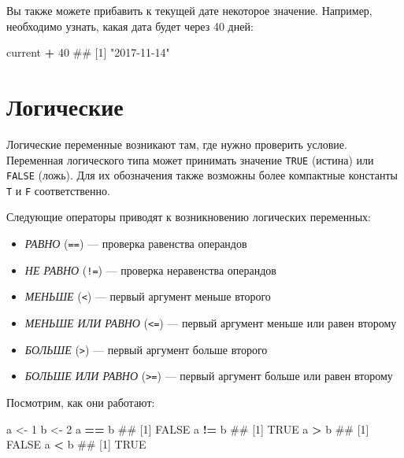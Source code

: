 \documentclass[]{book}
\newenvironment{Shaded}{\begin{snugshade}}{\end{snugshade}}
\newcommand{\DecValTok}[1]{\textcolor[rgb]{0.00,0.00,0.81}{#1}}
\newcommand{\StringTok}[1]{\textcolor[rgb]{0.31,0.60,0.02}{#1}}
\newcommand{\OperatorTok}[1]{\textcolor[rgb]{0.81,0.36,0.00}{\textbf{#1}}}
\newcommand{\NormalTok}[1]{#1}
\providecommand{\tightlist}{%
  \setlength{\itemsep}{0pt}\setlength{\parskip}{0pt}}
\begin{document}
Вы также можете прибавить к текущей дате некоторое значение. Например,
необходимо узнать, какая дата будет через 40 дней:

\begin{Shaded}
\begin{Highlighting}[]
\NormalTok{current }\OperatorTok{+}\StringTok{ }\DecValTok{40}
\NormalTok{## [1] "2017-11-14"}
\end{Highlighting}
\end{Shaded}

\section{Логические}\label{booleans}

Логические переменные возникают там, где нужно проверить условие.
Переменная логического типа может принимать значение \texttt{TRUE}
(истина) или \texttt{FALSE} (ложь). Для их обозначения также возможны
более компактные константы \texttt{T} и \texttt{F} соответственно.

Следующие операторы приводят к возникновению логических переменных:

\begin{itemize}
\tightlist
\item
  \emph{РАВНО} (\texttt{==}) --- проверка равенства операндов
\item
  \emph{НЕ РАВНО} (\texttt{!=}) --- проверка неравенства операндов
\item
  \emph{МЕНЬШЕ} (\texttt{\textless{}}) --- первый аргумент меньше
  второго
\item
  \emph{МЕНЬШЕ ИЛИ РАВНО} (\texttt{\textless{}=}) --- первый аргумент
  меньше или равен второму
\item
  \emph{БОЛЬШЕ} (\texttt{\textgreater{}}) --- первый аргумент больше
  второго
\item
  \emph{БОЛЬШЕ ИЛИ РАВНО} (\texttt{\textgreater{}=}) --- первый аргумент
  больше или равен второму
\end{itemize}

Посмотрим, как они работают:

\begin{Shaded}
\begin{Highlighting}[]
\NormalTok{a <-}\StringTok{ }\DecValTok{1}
\NormalTok{b <-}\StringTok{ }\DecValTok{2}
\NormalTok{a }\OperatorTok{==}\StringTok{ }\NormalTok{b}
\NormalTok{## [1] FALSE}
\NormalTok{a }\OperatorTok{!=}\StringTok{ }\NormalTok{b}
\NormalTok{## [1] TRUE}
\NormalTok{a }\OperatorTok{>}\StringTok{ }\NormalTok{b}
\NormalTok{## [1] FALSE}
\NormalTok{a }\OperatorTok{<}\StringTok{ }\NormalTok{b}
\NormalTok{## [1] TRUE}
\end{Highlighting}
\end{Shaded}
\end{document}

